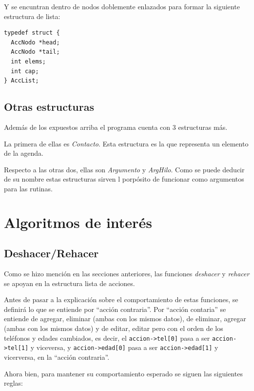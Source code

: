 \documentclass[11pt]{article}
\begin{document}
Y se encuntran dentro de nodos doblemente enlazados para formar la siguiente estructura de lista:

\begin{lstlisting}[style = CStyle]
typedef struct {
  AccNodo *head;
  AccNodo *tail;
  int elems;
  int cap;
} AccList;
\end{lstlisting}

\subsection{Otras estructuras}

Adem\'as de los expuestos arriba el programa cuenta con 3 estructuras m\'as. 

La primera de ellas es \emph{Contacto}. Esta estructura es la que representa un elemento de la agenda. 

Respecto a las otras dos, ellas son \emph{Argumento} y \emph{ArgHilo}. Como se puede deducir de su nombre estas estructuras 
sirven l porp\'osito de funcionar como argumentos para las rutinas.

\section{Algoritmos de inter\'es}

    \subsection{Deshacer/Rehacer}
    Como se hizo menci\'on en las secciones anteriores, las funciones \emph{deshacer} y \emph{rehacer} se apoyan en la estructura lista de acciones.

    Antes de pasar a la explicaci\'on sobre el comportamiento de estas funciones, se definir\'a lo que se entiende por ``acci\'on contraria''. Por ``acci\'on contaria'' se entiende de agregar, eliminar (ambas con los mismos datos), 
    de eliminar, agregar (ambas con los mismos datos) y de editar, editar pero con el orden de los tel\'efonos y edades cambiados, es decir, el \verb|accion->tel[0]| pasa a ser \verb|accion->tel[1]| y viceversa, y \verb|accion->edad[0]| pasa a ser \verb|accion->edad[1]| y vicerversa, en la ``acci\'on contraria''.

    Ahora bien, para mantener su comportamiento esperado se siguen las siguientes reglas:
\end{document}
